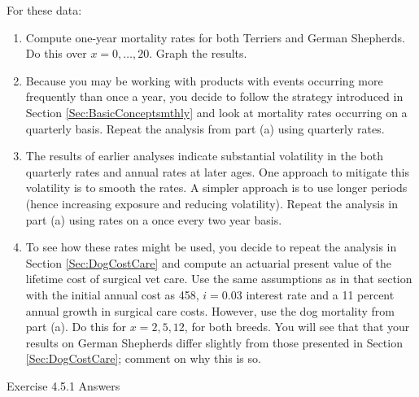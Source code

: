 \documentclass[
]{book}
\providecommand{\tightlist}{%
  \setlength{\itemsep}{0pt}\setlength{\parskip}{0pt}}
\begin{document}
For these data:

\begin{enumerate}
\def\labelenumi{\alph{enumi}.}
\tightlist
\item
  Compute one-year mortality rates for both Terriers and German Shepherds. Do this over \(x=0, \ldots, 20\). Graph the results.
\item
  Because you may be working with products with events occurring more frequently than once a year, you decide to follow the strategy introduced in Section \ref{Sec:BasicConceptsmthly} and look at mortality rates occurring on a quarterly basis. Repeat the analysis from part (a) using quarterly rates.
\item
  The results of earlier analyses indicate substantial volatility in the both quarterly rates and annual rates at later ages. One approach to mitigate this volatility is to smooth the rates. A simpler approach is to use longer periods (hence increasing exposure and reducing volatility). Repeat the analysis in part (a) using rates on a once every two year basis.
\item
  To see how these rates might be used, you decide to repeat the analysis in Section \ref{Sec:DogCostCare} and compute an actuarial present value of the lifetime cost of surgical vet care. Use the same assumptions as in that section with the initial annual cost as 458, \(i=0.03\) interest rate and a 11 percent annual growth in surgical care costs. However, use the dog mortality from part (a). Do this for \(x=2, 5, 12\), for both breeds. You will see that that your results on German Shepherds differ slightly from those presented in Section \ref{Sec:DogCostCare}; comment on why this is so.
\end{enumerate}

Exercise 4.5.1 Answers
\end{document}
